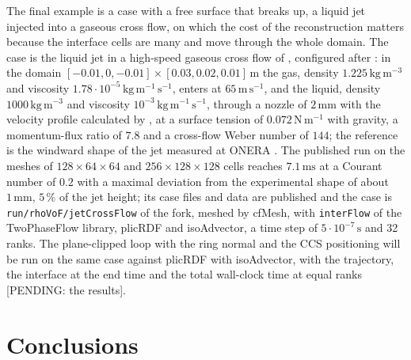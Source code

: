 \documentclass[preprint,12pt]{elsarticle}
\begin{document}
The final example is a case with a free surface that breaks up, a liquid jet injected into a gaseous cross flow, on which the cost of the reconstruction matters because the interface cells are many and move through the whole domain. The case is the liquid jet in a high-speed gaseous cross flow of \citet{LiuEtAl2024Inconsistencies}, configured after \citet{ZuzioEtAl2020}: in the domain $[-0.01, 0, -0.01] \times [0.03, 0.02, 0.01]\,\mathrm{m}$ the gas, density $1.225\,\mathrm{kg\,m^{-3}}$ and viscosity $1.78\cdot10^{-5}\,\mathrm{kg\,m^{-1}\,s^{-1}}$, enters at $65\,\mathrm{m\,s^{-1}}$, and the liquid, density $1000\,\mathrm{kg\,m^{-3}}$ and viscosity $10^{-3}\,\mathrm{kg\,m^{-1}\,s^{-1}}$, through a nozzle of $2\,\mathrm{mm}$ with the velocity profile calculated by \citet{Thuillet2018}, at a surface tension of $0.072\,\mathrm{N\,m^{-1}}$ with gravity, a momentum-flux ratio of $7.8$ and a cross-flow Weber number of $144$; the reference is the windward shape of the jet measured at ONERA \citep{DesclauxEtAl2020,BodocEtAl2020}. The published run on the meshes of $128 \times 64 \times 64$ and $256 \times 128 \times 128$ cells reaches $7.1\,\mathrm{ms}$ at a Courant number of $0.2$ with a maximal deviation from the experimental shape of about $1\,\mathrm{mm}$, $5\,\%$ of the jet height; its case files and data are published \citep{MaricLiu2023Code,MaricLiu2023Data} and the case is \texttt{run/rhoVoF/jetCrossFlow} of the fork, meshed by cfMesh, with \texttt{interFlow} of the TwoPhaseFlow library, plicRDF and isoAdvector, a time step of $5\cdot10^{-7}\,\mathrm{s}$ and 32 ranks. The plane-clipped loop with the ring normal and the CCS positioning will be run on the same case against plicRDF with isoAdvector, with the trajectory, the interface at the end time and the total wall-clock time at equal ranks [PENDING: the results].

\section{Conclusions}
\label{sec:concl}
\end{document}
